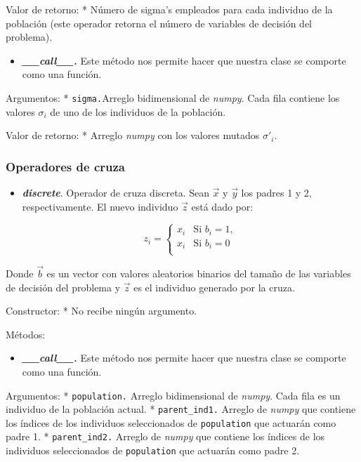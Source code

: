 \documentclass[11pt]{article}
\providecommand{\tightlist}{%
      \setlength{\itemsep}{0pt}\setlength{\parskip}{0pt}}
\begin{document}
Valor de retorno: * Número de sigma's empleados para cada individuo de
la población (este operador retorna el número de variables de decisión
del problema).

\begin{itemize}
\tightlist
\item
  \emph{\textbf{\_\_call\_\_.}} Este método nos permite hacer que
  nuestra clase se comporte como una función.
\end{itemize}

Argumentos: * \texttt{sigma.}Arreglo bidimensional de \emph{numpy}. Cada
fila contiene los valores \(\sigma_i\) de uno de los individuos de la
población.

Valor de retorno: * Arreglo \emph{numpy} con los valores mutados
\(\sigma'_i\).

    \subsubsection{Operadores de cruza}\label{operadores-de-cruza}

    \begin{itemize}
\tightlist
\item
  \emph{\textbf{discrete}}. Operador de cruza discreta. Sean \(\vec{x}\)
  y \(\vec{y}\) los padres 1 y 2, respectivamente. El nuevo individuo
  \(\vec{z}\) está dado por:

  \begin{equation}
    z_{i} = 
    \begin{cases}
     x_{i} & \text{Si } b_{i} = 1, \\
     x_{i}  & \text{Si } b_{i} = 0 \\
    \end{cases}
  \end{equation}
\end{itemize}

Donde \(\vec{b}\) es un vector con valores aleatorios binarios del
tamaño de las variables de decisión del problema y \(\vec{z}\) es el
individuo generado por la cruza.

Constructor: * No recibe ningún argumento.

Métodos:

\begin{itemize}
\tightlist
\item
  \emph{\textbf{\_\_call\_\_.}} Este método nos permite hacer que
  nuestra clase se comporte como una función.
\end{itemize}

Argumentos: * \texttt{population.} Arreglo bidimensional de
\emph{numpy}. Cada fila es un individuo de la población actual. *
\texttt{parent\_ind1.} Arreglo de \emph{numpy} que contiene los índices
de los individuos seleccionados de \texttt{population} que actuarán como
padre 1. * \texttt{parent\_ind2.} Arreglo de \emph{numpy} que contiene
los índices de los individuos seleccionados de \texttt{population} que
actuarán como padre 2.
\end{document}
